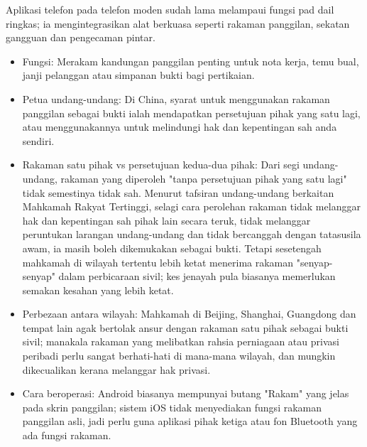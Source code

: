 


Aplikasi telefon pada telefon moden sudah lama melampaui fungsi pad dail ringkas; ia mengintegrasikan alat berkuasa seperti rakaman panggilan, sekatan gangguan dan pengecaman pintar.


\begin{itemize}
  \item Fungsi: Merakam kandungan panggilan penting untuk nota kerja, temu bual, janji pelanggan atau simpanan bukti bagi pertikaian.
  \item Petua undang-undang: Di China, syarat untuk menggunakan rakaman panggilan sebagai bukti ialah mendapatkan persetujuan pihak yang satu lagi, atau menggunakannya untuk melindungi hak dan kepentingan sah anda sendiri.
  \item Rakaman satu pihak vs persetujuan kedua-dua pihak: Dari segi undang-undang, rakaman yang diperoleh "tanpa persetujuan pihak yang satu lagi" tidak semestinya tidak sah. Menurut tafsiran undang-undang berkaitan Mahkamah Rakyat Tertinggi, selagi cara perolehan rakaman tidak melanggar hak dan kepentingan sah pihak lain secara teruk, tidak melanggar peruntukan larangan undang-undang dan tidak bercanggah dengan tatasusila awam, ia masih boleh dikemukakan sebagai bukti. Tetapi sesetengah mahkamah di wilayah tertentu lebih ketat menerima rakaman "senyap-senyap" dalam perbicaraan sivil; kes jenayah pula biasanya memerlukan semakan kesahan yang lebih ketat.
  \item Perbezaan antara wilayah: Mahkamah di Beijing, Shanghai, Guangdong dan tempat lain agak bertolak ansur dengan rakaman satu pihak sebagai bukti sivil; manakala rakaman yang melibatkan rahsia perniagaan atau privasi peribadi perlu sangat berhati-hati di mana-mana wilayah, dan mungkin dikecualikan kerana melanggar hak privasi.
  \item Cara beroperasi: Android biasanya mempunyai butang "Rakam" yang jelas pada skrin panggilan; sistem iOS tidak menyediakan fungsi rakaman panggilan asli, jadi perlu guna aplikasi pihak ketiga atau fon Bluetooth yang ada fungsi rakaman.
\end{itemize}

